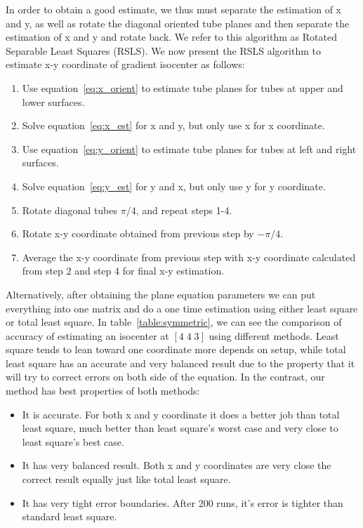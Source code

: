 In order to obtain a good estimate, we thus must separate the estimation of x and y, as well as rotate the diagonal oriented tube planes and then separate the estimation of x and y and rotate back.  We refer to this algorithm as Rotated
Separable Least Squares (RSLS). We now present the RSLS algorithm to estimate x-y coordinate of gradient isocenter as follows:

\begin{enumerate}
\item Use equation~\ref{eq:x_orient} to estimate tube planes for tubes at upper and lower surfaces.
\item Solve equation~\ref{eq:x_est} for x and y, but only use x for x coordinate.
\item Use equation~\ref{eq:y_orient} to estimate tube planes for tubes at left and right surfaces.
\item Solve equation~\ref{eq:y_est} for y and x, but only use y for y coordinate.
\item Rotate diagonal tubes $\pi/4$, and repeat steps 1-4.
\item Rotate x-y coordinate obtained from previous step by $-\pi/4$.
\item Average the x-y coordinate from previous step with x-y coordinate calculated from step 2 and step 4 for final x-y estimation.
\end{enumerate}

Alternatively, after obtaining the plane equation parameters we can put everything into one matrix and do
a one time estimation using either least square or total least square. In table~\ref{table:symmetric}, we
can see the comparison of accuracy of estimating an isocenter at $[4 \; 4\; 3]$ using different methods.
Least square tends to lean toward one coordinate
more depends on setup, while total least square has an accurate and very balanced result due to the property
that it will try to correct errors on both side of the equation. In the contrast, our method has best
properties of both methods:

\begin{itemize}
  \item It is accurate. For both x and y coordinate it does a better job than total least square, much better than least square's worst case and very close to least square's best case.
  \item It has very balanced result. Both x and y coordinates are very close the correct result equally just like total least square.
  \item It has very tight error boundaries. After 200 runs, it's error is tighter than standard least square.
\end{itemize}

